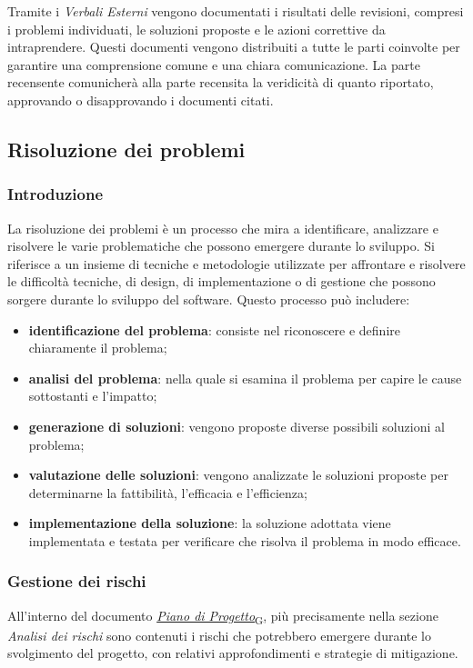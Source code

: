 Tramite i \textit{Verbali Esterni} vengono documentati i risultati delle revisioni, compresi i problemi individuati, le soluzioni proposte e le azioni correttive da intraprendere. Questi documenti vengono distribuiti a tutte le parti coinvolte per garantire una comprensione comune e una chiara comunicazione. La parte recensente comunicherà alla parte recensita la veridicità di quanto riportato, approvando o disapprovando i documenti citati.

\subsection{Risoluzione dei problemi}
\subsubsection{Introduzione}
La risoluzione dei problemi è un processo che mira a identificare, analizzare e risolvere le varie problematiche che possono emergere durante lo sviluppo. Si riferisce a un insieme di tecniche e metodologie utilizzate per affrontare e risolvere le difficoltà tecniche, di design, di implementazione o di gestione che possono sorgere durante lo sviluppo del software. Questo processo può includere:
\begin{itemize}
	\item \textbf{identificazione del problema}: consiste nel riconoscere e definire chiaramente il problema;
	\item \textbf{analisi del problema}: nella quale si esamina il problema per capire le cause sottostanti e l'impatto;
	\item \textbf{generazione di soluzioni}: vengono proposte diverse possibili soluzioni al problema;
	\item \textbf{valutazione delle soluzioni}: vengono analizzate le soluzioni proposte per determinarne la fattibilità, l'efficacia e l'efficienza;
	\item \textbf{implementazione della soluzione}: la soluzione adottata viene implementata e testata per verificare che risolva il problema in modo efficace.
\end{itemize}

\subsubsection{Gestione dei rischi}
All'interno del documento \href{https://7last.github.io/docs/rtb/documentazione-interna/glossario\#piano-di-progetto}{\textit{Piano di Progetto}\textsubscript{G}}, più precisamente nella sezione \textit{Analisi dei rischi} sono contenuti i rischi che potrebbero emergere durante lo svolgimento del progetto, con relativi approfondimenti e strategie di mitigazione.

